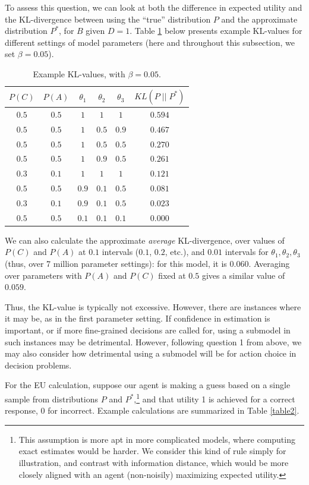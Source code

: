 \documentclass[10pt,letterpaper]{article}
\begin{document}
To assess this question, we can look at both the difference in expected utility and the KL-divergence between using the ``true'' distribution $P$ and the approximate distribution $P^*$, for $B$ given $D=1$. Table \ref{table1} below presents example KL-values for different settings of model parameters (here and throughout this subsection, we set $\beta = 0.05$).

\begin{table}[h]  \begin{center}
\begin{tabular}{c | c | c | c | c || c}
 $P(C)$ & $P(A)$ & $\theta_1$ & $\theta_2$ & $\theta_3$ & $KL(P \;\vert\vert\; P^*)$ \\ \hline
 $0.5$ & $0.5$ & $1$ & $1$ & $1$  & $0.594$ \\
  $0.5$ & $0.5$ & $1$ & $0.5$ & $0.9$  & $0.467$ \\
  $0.5$ & $0.5$ &$1$ & $0.5$ & $0.5$  & $0.270$ \\
 $0.5$ & $0.5$ & $1$ & $0.9$ & $0.5$  & $0.261$ \\
  $0.3$ & $0.1$ & $1$ & $1$ & $1$ & $0.121$ \\
 $0.5$ & $0.5$ &  $0.9$ & $0.1$ & $0.5$  & $0.081$ \\
  $0.3$ & $0.1$ & $0.9$ & $0.1$ & $0.5$ & $0.023$ \\
 $0.5$ & $0.5$ & $0.1$ & $0.1$ & $0.1$ & $0.000$ 
\end{tabular} \end{center} \caption{Example KL-values, with $\beta = 0.05$.} \label{table1}
\end{table}
We can also calculate the approximate \emph{average} KL-divergence, over values of $P(C)$ and $P(A)$ at $0.1$ intervals ($0.1$, $0.2$, etc.), and $0.01$ intervals for $\theta_1,\theta_2,\theta_3$ (thus, over 7 million parameter settings): for this model, it is $0.060$. Averaging over parameters with $P(A)$ and $P(C)$ fixed at $0.5$ gives a similar value of $0.059$.

Thus, the KL-value is typically not excessive. However, there are instances where it may be, as in the first parameter setting. If confidence in estimation is important, or if more fine-grained decisions are called for, using a submodel in such instances may be detrimental. However, following question 1 from above, we may also consider how detrimental using a submodel will be for action choice in decision problems.

For the EU calculation, suppose our agent is making a guess based on a single sample from distributions $P$ and $P^*$,\footnote{This assumption is more apt in more complicated models, where computing exact estimates would be harder. We consider this kind of rule simply for illustration, and contrast with information distance, which would be more closely aligned with an agent (non-noisily) maximizing expected utility.} and that utility 1 is achieved for a correct response, 0 for incorrect. Example calculations are summarized in Table \ref{table2}.
\end{document}
